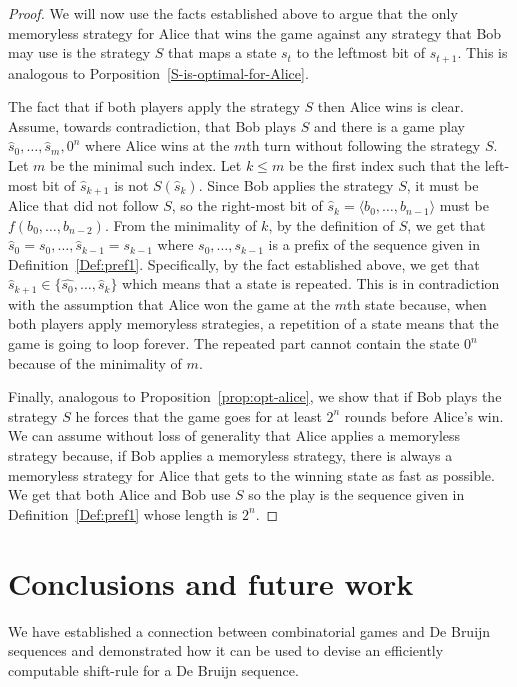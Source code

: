 \documentclass[final,12pt]{elsarticle}
\theoremstyle{definition} \newtheorem{definition}[theorem]{Definition} \newtheorem{observation}[theorem]{Observation} \newtheorem{example}[theorem]{Example} \newtheorem{remark}[theorem]{Remark} \newtheorem{corrolary}[theorem]{Corrolary}
\newcommand{\REF}[2]{#1~\ref{#2}}
\newcommand{\T}[1]{\langle{#1}\rangle} \DeclareMathOperator{\drop}{drop} \DeclareMathOperator{\dropbits}{drop\_bits} \DeclareMathOperator{\dropstates}{drop\_states} \DeclareMathOperator{\leadingForm}{LeadingForm} \DeclareMathOperator{\dv}{div} %
\begin{document}
\begin{proof}
	We will now use the facts established above to argue that the only memoryless strategy for Alice that wins the game against any strategy that Bob may use is the strategy $S$ that maps a state $s_t$ to the leftmost bit of $s_{t+1}$. This is analogous to Porposition~\ref{S-is-optimal-for-Alice}.
	
	The fact that if both players apply the strategy $S$ then Alice wins is clear.
	Assume, towards contradiction, that Bob plays $S$ and there is a game play $\hat{s}_0,\dots, \hat{s}_m,0^n$ where Alice wins at the $m$th turn without following the strategy $S$. Let $m$ be the minimal such index. Let $k \leq m$ be the first index such that the left-most bit of $ \hat{s}_{k+1}$ is not $S( \hat{s}_k)$. Since Bob applies the strategy $S$, it must be Alice that did not follow $S$, so the right-most bit of $\hat{s}_k=\T{b_0,\dots,b_{n-1}}$ must be $f(b_0,\dots,b_{n-2})$. From the minimality of $k$, by the definition of $S$, we get that $ \hat{s}_0=s_0,\dots, \hat{s}_{k-1}=s_{k-1}$ where $s_0,\dots,s_{k-1}$ is a prefix of the sequence given in \REF{Definition}{Def:pref1}. Specifically, by the fact established above, we get that $ \hat{s}_{k+1} \in \{ \hat{s_0},\dots,  \hat{s}_k\}$ which means that a state is repeated. This is in contradiction with the assumption that Alice won the game at the $m$th state because, when both players apply memoryless strategies, a repetition of a state means that the game is going to loop forever. The repeated part cannot contain the state $0^n$ because of the minimality of $m$.

	Finally, analogous to Proposition~\ref{prop:opt-alice}, we show that if Bob plays the strategy $S$ he forces that the game goes for at least $2^n$ rounds before Alice's win. We can assume without loss of generality that Alice applies a memoryless strategy because, if Bob applies a memoryless strategy, there is always a memoryless strategy for Alice that gets to the winning state as fast as possible. We get that both Alice and Bob use $S$ so the play is the sequence given in \REF{Definition}{Def:pref1} whose length is $2^n$.
\end{proof}

\section{Conclusions and future work}
We have established a connection between combinatorial games and De Bruijn sequences and demonstrated how it can be used to devise an efficiently computable shift-rule for a De Bruijn sequence.
\end{document}
